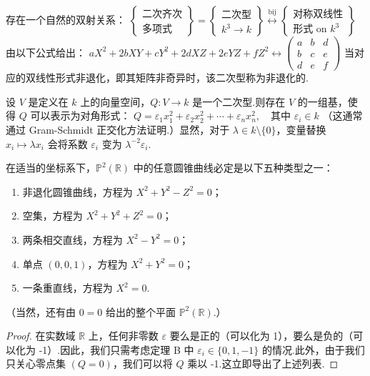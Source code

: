 \begin{proposition}[A]
存在一个自然的双射关系：
\(
\left\{ \begin{array}{c} \text{二次齐次} \\ \text{多项式} \end{array} \right\} = \left\{ \begin{array}{c} \text{二次型} \\ k^3 \to k \end{array} \right\} \overset{\text{bij}}{\longleftrightarrow} \left\{ \begin{array}{c} \text{对称双线性} \\ \text{形式 on } k^3 \end{array} \right\}
\)
由以下公式给出：
\(
aX^2 + 2bXY + cY^2 + 2dXZ + 2eYZ + fZ^2 \longleftrightarrow \begin{pmatrix} a & b & d \\ b & c & e \\ d & e & f \end{pmatrix}
\)
当对应的双线性形式非退化，即其矩阵非奇异时，该二次型称为非退化的.
\end{proposition}

\begin{theorem}[B]
设 \(V\) 是定义在 \(k\) 上的向量空间，\(Q: V \to k\) 是一个二次型.则存在 \(V\) 的一组基，使得 \(Q\) 可以表示为对角形式：
\(
Q = \varepsilon_1 x_1^2 + \varepsilon_2 x_2^2 + \cdots + \varepsilon_n x_n^2, \quad \text{其中 } \varepsilon_i \in k
\)
（这通常通过 Gram-Schmidt 正交化方法证明.）显然，对于 \(\lambda \in k \setminus \{0\}\)，变量替换 \(x_i \mapsto \lambda x_i\) 会将系数 \(\varepsilon_i\) 变为 \(\lambda^{-2}\varepsilon_i\).

\end{theorem}

\begin{corollary}
在适当的坐标系下，\(\mathbb{P}^2(\mathbb{R})\) 中的任意圆锥曲线必定是以下五种类型之一：
\begin{enumerate}[(\(\alpha\))]
    \item 非退化圆锥曲线，方程为 \(X^2 + Y^2 - Z^2 = 0\)；
    \item 空集，方程为 \(X^2 + Y^2 + Z^2 = 0\)；
    \item 两条相交直线，方程为 \(X^2 - Y^2 = 0\)；
    \item 单点 \((0,0,1)\)，方程为 \(X^2 + Y^2 = 0\)；
    \item 一条重直线，方程为 \(X^2 = 0\).
\end{enumerate}
（当然，还有由 \(0=0\) 给出的整个平面 \(\mathbb{P}^2(\mathbb{R})\).）
\end{corollary}
\begin{proof}
在实数域 \(\mathbb{R}\) 上，任何非零数 \(\varepsilon\) 要么是正的（可以化为 1），要么是负的（可以化为 -1）.因此，我们只需考虑定理 B 中 \(\varepsilon_i \in \{0, 1, -1\}\) 的情况.此外，由于我们只关心零点集 \((Q=0)\)，我们可以将 \(Q\) 乘以 -1.这立即导出了上述列表.
\end{proof}


